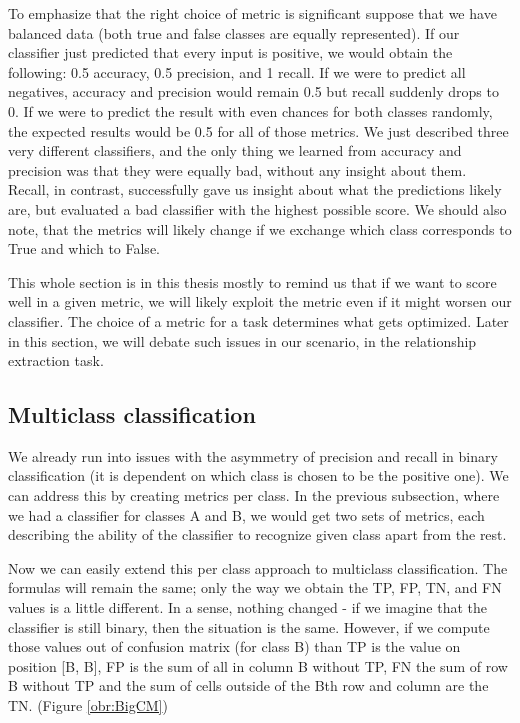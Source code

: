 To emphasize that the right choice of metric is significant suppose that we have balanced data (both true and false classes are equally represented). If our classifier just predicted that every input is positive, we would obtain the following: 0.5 accuracy, 0.5 precision, and 1 recall. If we were to predict all negatives, accuracy and precision would remain 0.5 but recall suddenly drops to 0. If we were to predict the result with even chances for both classes randomly, the expected results would be 0.5 for all of those metrics. We just described three very different classifiers, and the only thing we learned from accuracy and precision was that they were equally bad, without any insight about them. Recall, in contrast, successfully gave us insight about what the predictions likely are, but evaluated a bad classifier with the highest possible score. We should also note, that the metrics will likely change if we exchange which class corresponds to True and which to False. 

This whole section is in this thesis mostly to remind us that if we want to score well in a given metric, we will likely exploit the metric even if it might worsen our classifier. The choice of a metric for a task determines what gets optimized. Later in this section, we will debate such issues in our scenario, in the relationship extraction task.





\subsection{Multiclass classification}


We already run into issues with the asymmetry of precision and recall in binary classification (it is dependent on which class is chosen to be the positive one). We can address this by creating metrics per class. In the previous subsection, where we had a classifier for classes A and B, we would get two sets of metrics, each describing the ability of the classifier to recognize given class apart from the rest.

Now we can easily extend this per class approach to multiclass classification. The formulas will remain the same; only the way we obtain the TP, FP, TN, and FN values is a little different. In a sense, nothing changed - if we imagine that the classifier is still binary, then the situation is the same. However, if we compute those values out of confusion matrix (for class B) than TP is the value on position [B, B], FP is the sum of all in column B without TP, FN the sum of row B without TP and the sum of cells outside of the Bth row and column are the TN. (Figure \ref{obr:BigCM})



